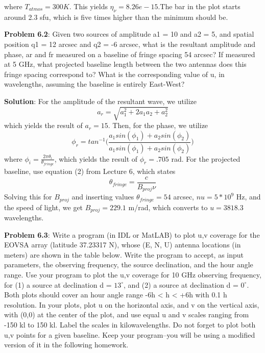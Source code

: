 \documentclass{article}
\begin{document}
where $T_{atmos} = 300K$.  This yields $\eta_{\nu} = 8.26e-15$.The bar in the plot starts around 2.3 sfu, which is five times higher than the minimum should be.


\textbf{Problem 6.2}: Given two sources of amplitude a1 = 10 and a2 = 5, and spatial position q1 = 12 arcsec and q2 = -6 arcsec, what is the resultant amplitude and phase, ar and fr measured on a baseline of fringe spacing 54 arcsec?  If measured at 5 GHz, what projected baseline length between the two antennas does this fringe spacing correspond to?  What is the corresponding value of u, in wavelengths, assuming the baseline is entirely East-West?

\bigskip
\textbf{Solution}:  For the amplitude of the resultant wave, we utilize 
\begin{equation}
a_r = \sqrt{a_1^2 + 2a_1a_2 + a_2^2}
\end{equation}
which yields the result of $a_r = 15$.  Then, for the phase, we utilize
\begin{equation}
\phi_r = tan^{-1}\bigg(\frac{a_1 sin(\phi _1) + a_2 sin(\phi _2)}{a_1 sin(\phi _1) + a_2 sin(\phi _2)}\bigg)
\end{equation}
where $\phi _i = \frac{2\pi \theta _i}{\theta_{fringe}} $, which yields the result of $\phi _r = .705 $ rad.  For the projected baseline, use equation (2) from Lecture 6, which states 
\begin{equation}
\theta _{fringe} = \frac{c}{B_{proj}\nu}
\end{equation}
Solving this for $B_{proj}$ and inserting values $\theta _{fringe} = 54$ arcsec, $nu=5*10^9$ Hz, and the speed of light, we get $B_{proj} = 229.1$ m/rad, which converts to $u = 3818.3$ wavelengths.

\textbf{Problem 6.3}: Write a program (in IDL or MatLAB) to plot u,v coverage for the EOVSA array (latitude 37.23317 N), whose (E, N, U) antenna locations (in meters) are shown in the table below. Write the program to accept, as input parameters, the observing frequency, the source declination, and the hour angle range. Use your program to plot the u,v coverage for 10 GHz observing frequency, for (1) a source at declination d = $13^\circ$, and (2) a source at declination d = $0^\circ$. Both plots should cover an hour angle range -6h < h < +6h with 0.1 h resolution. In your plots, plot u on the horizontal axis, and v on the vertical axis, with (0,0) at the center of the plot, and use equal u and v scales ranging from -150 kl to 150 kl. Label the scales in kilowavelengths. Do not forget to plot both u,v points for a given baseline. Keep your program--you will be using a modified version of it in the following homework.
\end{document}

